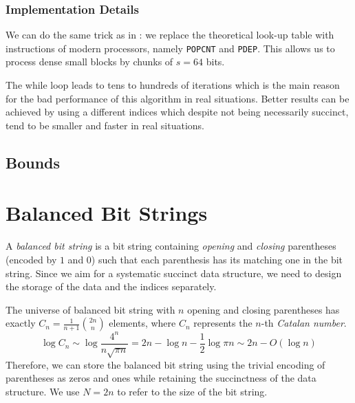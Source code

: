 \subsubsection{Implementation Details}

We can do the same trick as in \rank{}: we replace the theoretical look-up table with instructions of modern processors, namely \verb|POPCNT| and \verb|PDEP|.
This allows us to process dense small blocks by chunks of $s = 64$ bits.

The while loop leads to tens to hundreds of iterations which is the main reason for the bad performance of this algorithm in real situations.
Better results can be achieved by using a different indices which despite not being necessarily succinct, tend to be smaller and faster in real situations.

\subsection{Bounds}


\section{Balanced Bit Strings}

A \emph{balanced bit string} is a bit string containing \emph{opening} and \emph{closing} parentheses (encoded by $1$ and $0$) such that each parenthesis has its matching one in the bit string.
Since we aim for a systematic succinct data structure, we need to design the storage of the data and the indices separately.

The universe of balanced bit string with $n$ opening and closing parentheses has exactly $C_n = \frac{1}{n+1} {2n \choose n}$ elements, where $C_n$ represents the $n$-th \emph{Catalan number}.
$$ \log C_n \sim \log \frac{4^n}{n \sqrt{\pi n}} = 2n - \log n - \frac{1}{2} \log{\pi n} \sim 2n - O(\log n) $$
Therefore, we can store the balanced bit string using the trivial encoding of parentheses as zeros and ones while retaining the succinctness of the data structure.
We use $N = 2n$ to refer to the size of the bit string.

